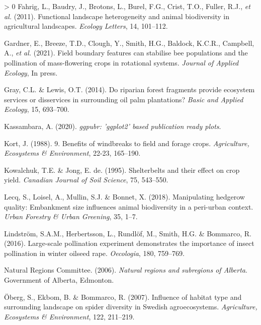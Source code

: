 \documentclass[]{elsarticle} %
\newlength{\cslhangindent}
\newenvironment{CSLReferences}[3] %
 {%
  \setlength{\parindent}{0pt}
  \ifodd #1 \everypar{\setlength{\hangindent}{\cslhangindent}}\ignorespaces\fi
  \ifnum #2 > 0
  \setlength{\parskip}{#2\baselineskip}
  \fi
 }%
 {}
\begin{document}
\begin{CSLReferences}{1}{0}
\leavevmode\hypertarget{ref-fahrig2011}{}%
Fahrig, L., Baudry, J., Brotons, L., Burel, F.G., Crist, T.O., Fuller, R.J., \emph{et al.} (2011). Functional landscape heterogeneity and animal biodiversity in agricultural landscapes. \emph{Ecology Letters}, 14, 101--112.

\leavevmode\hypertarget{ref-gardner2021}{}%
Gardner, E., Breeze, T.D., Clough, Y., Smith, H.G., Baldock, K.C.R., Campbell, A., \emph{et al.} (2021). Field boundary features can stabilise bee populations and the pollination of mass-flowering crops in rotational systems. \emph{Journal of Applied Ecology}, In press.

\leavevmode\hypertarget{ref-gray2014}{}%
Gray, C.L. \& Lewis, O.T. (2014). Do riparian forest fragments provide ecosystem services or disservices in surrounding oil palm plantations? \emph{Basic and Applied Ecology}, 15, 693--700.

\leavevmode\hypertarget{ref-kassambara2020}{}%
Kassambara, A. (2020). \emph{{ggpubr}: 'ggplot2' based publication ready plots}.

\leavevmode\hypertarget{ref-kort1988}{}%
Kort, J. (1988). 9. Benefits of windbreaks to field and forage crops. \emph{Agriculture, Ecosystems {\&} Environment}, 22-23, 165--190.

\leavevmode\hypertarget{ref-kowalchuk1995}{}%
Kowalchuk, T.E. \& Jong, E. de. (1995). Shelterbelts and their effect on crop yield. \emph{Canadian Journal of Soil Science}, 75, 543--550.

\leavevmode\hypertarget{ref-lecq2018}{}%
Lecq, S., Loisel, A., Mullin, S.J. \& Bonnet, X. (2018). Manipulating hedgerow quality: Embankment size influences animal biodiversity in a peri-urban context. \emph{Urban Forestry {\&} Urban Greening}, 35, 1--7.

\leavevmode\hypertarget{ref-lindstrom2016}{}%
Lindström, S.A.M., Herbertsson, L., Rundlöf, M., Smith, H.G. \& Bommarco, R. (2016). Large-scale pollination experiment demonstrates the importance of insect pollination in winter oilseed rape. \emph{Oecologia}, 180, 759--769.

\leavevmode\hypertarget{ref-ABRegions2006}{}%
Natural Regions Committee. (2006). \emph{Natural regions and subregions of {Alberta}}. Government of Alberta, Edmonton.

\leavevmode\hypertarget{ref-oberg2007}{}%
Öberg, S., Ekbom, B. \& Bommarco, R. (2007). Influence of habitat type and surrounding landscape on spider diversity in {Swedish} agroecosystems. \emph{Agriculture, Ecosystems {\&} Environment}, 122, 211--219.


\end{CSLReferences}
\end{document}
